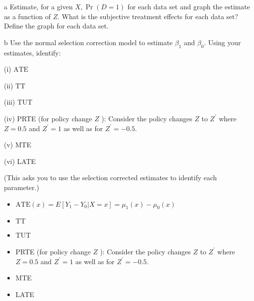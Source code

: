 \documentclass{article}
\begin{document}
 
 


\begin{problem}{a}
Estimate, for a given $X, \operatorname{Pr}(D=1)$ for each data set and graph the estimate as a function of $Z$. What is the subjective treatment effects for each data set? Define the graph for each data set.
\end{problem}
\begin{solution}
\end{solution}

\begin{problem}{b}
Use the normal selection correction model to estimate $\beta_{1}$ and $\beta_{0}$. Using your estimates, identify:

(i) $\mathrm{ATE}$

(ii) $\mathrm{TT}$

(iii) TUT

(iv) PRTE (for policy change $Z$ ): Consider the policy changes $Z$ to $Z^{\prime}$ where $Z=0.5$ and $Z^{\prime}=1$ as well as for $Z^{\prime}=-0.5$.

(v) MTE

(vi) LATE

(This asks you to use the selection corrected estimates to identify each parameter.)
\end{problem}
\begin{solution}
\begin{itemize}[(i)]
    \item $\mathrm{ATE}(x) = E[Y_1 - Y_0 | X=x] = \mu_1(x)-\mu_0(x)$
    
    \item $\mathrm{TT}$
    
    \item TUT
    
    \item PRTE (for policy change $Z$ ): Consider the policy changes $Z$ to $Z^{\prime}$ where $Z=0.5$ and $Z^{\prime}=1$ as well as for $Z^{\prime}=-0.5$.
    
    \item MTE
    
    \item LATE

\end{itemize}


\end{solution}
\end{document}
